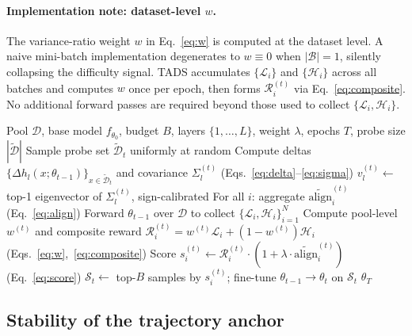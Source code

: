 \paragraph{Implementation note: dataset-level $w$.}
The variance-ratio weight $w$ in Eq.~\ref{eq:w} is computed at the
dataset level. A naive mini-batch implementation degenerates to
$w \equiv 0$ when $|\mathcal{B}|=1$, silently collapsing the
difficulty signal. \textsc{TADS} accumulates $\{\mathcal{L}_i\}$
and $\{\mathcal{H}_i\}$ across all batches and computes $w$ once
per epoch, then forms $\mathcal{R}_i^{(t)}$ via
Eq.~\ref{eq:composite}. No additional forward passes are required
beyond those used to collect $\{\mathcal{L}_i, \mathcal{H}_i\}$.

\begin{algorithm}[t]
\caption{Trajectory-Anchored Dynamic Selection (TADS)}
\label{alg:tads}
\begin{algorithmic}[1]
\REQUIRE Pool $\mathcal{D}$, base model $f_{\theta_0}$, budget $B$,
         layers $\{1,\ldots,L\}$, weight $\lambda$, epochs $T$, probe
         size $|\widetilde{\mathcal{D}}|$
  \STATE Sample probe set $\widetilde{\mathcal{D}}_t$ uniformly at random
    \STATE Compute deltas
           $\{\Delta h_l(x; \theta_{t-1})\}_{x \in \widetilde{\mathcal{D}}_t}$
           and covariance $\Sigma_l^{(t)}$
           \hfill (Eqs.~\ref{eq:delta}--\ref{eq:sigma})
    \STATE $v_l^{(t)} \leftarrow$ top-1 eigenvector of
           $\Sigma_l^{(t)}$, sign-calibrated
  \ENDFOR
  \STATE For all $i$: aggregate $\widetilde{\mathrm{align}}_i^{(t)}$
         \hfill (Eq.~\ref{eq:align})
  \STATE Forward $\theta_{t-1}$ over $\mathcal{D}$ to collect
         $\{\mathcal{L}_i, \mathcal{H}_i\}_{i=1}^N$
  \STATE Compute pool-level $w^{(t)}$ and composite reward
         $\mathcal{R}_i^{(t)} = w^{(t)}\mathcal{L}_i + (1-w^{(t)})\mathcal{H}_i$
         \hfill (Eqs.~\ref{eq:w},~\ref{eq:composite})
  \STATE Score
         $s_i^{(t)} \leftarrow
          \mathcal{R}_i^{(t)} \cdot
          (1 + \lambda \cdot \widetilde{\mathrm{align}}_i^{(t)})$
         \hfill (Eq.~\ref{eq:score})
  \STATE $\mathcal{S}_t \leftarrow$ top-$B$ samples by $s_i^{(t)}$;
         fine-tune $\theta_{t-1} \to \theta_t$ on $\mathcal{S}_t$
\ENDFOR
\RETURN $\theta_T$
\end{algorithmic}
\end{algorithm}

\subsection{Stability of the trajectory anchor}
\label{sec:method-theory}

